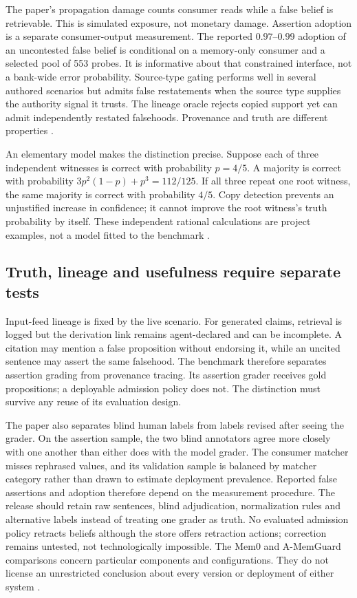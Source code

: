 The paper's propagation damage counts consumer reads while a false belief is
retrievable. This is simulated exposure, not monetary damage. Assertion
adoption is a separate consumer-output measurement. The reported
$0.97$--$0.99$ adoption of an uncontested false belief is conditional on a
memory-only consumer and a selected pool of 553 probes. It is informative
about that constrained interface, not a bank-wide error probability.
Source-type gating performs well in several authored scenarios but admits
false restatements when the source type supplies the authority signal it
trusts. The lineage oracle rejects copied support yet can admit independently
restated falsehoods. Provenance and truth are different properties
\citep{exec23_epistemic_admission}.

An elementary model makes the distinction precise. Suppose each of three
independent witnesses is correct with probability $p=4/5$. A majority is
correct with probability $3p^2(1-p)+p^3=112/125$. If all three repeat one
root witness, the same majority is correct with probability $4/5$. Copy
detection prevents an unjustified increase in confidence; it cannot improve
the root witness's truth probability by itself. These independent rational
calculations are project examples, not a model fitted to the benchmark
\citep{exec23_admission_conformal_reference}.

\subsection{Truth, lineage and usefulness require separate tests}
\label{exec23:admit-validation}
Input-feed lineage is fixed by the live scenario. For generated claims,
retrieval is logged but the derivation link remains agent-declared and can
be incomplete. A citation may mention a false proposition without endorsing
it, while an uncited sentence may assert the same falsehood. The benchmark
therefore separates assertion grading from provenance tracing. Its assertion
grader receives gold propositions; a deployable admission policy does not.
The distinction must survive any reuse of its evaluation design.

The paper also separates blind human labels from labels revised after seeing
the grader. On the assertion sample, the two blind annotators agree more
closely with one another than either does with the model grader. The consumer
matcher misses rephrased values, and its validation sample is balanced by
matcher category rather than drawn to estimate deployment prevalence.
Reported false assertions and adoption therefore depend on the measurement
procedure. The release should retain raw sentences, blind adjudication,
normalization rules and alternative labels instead of treating one grader as
truth. No evaluated admission policy retracts beliefs although the store
offers retraction actions; correction remains untested, not technologically
impossible. The Mem0 and A-MemGuard comparisons concern particular components
and configurations. They do not license an unrestricted conclusion about
every version or deployment of either system
\citep{exec23_epistemic_admission}.

